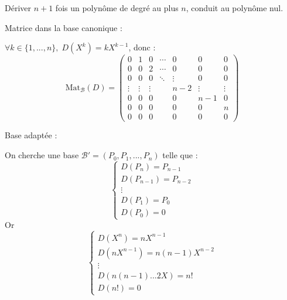 \documentclass[10pt,a4paper]{article}
\begin{document}
Dériver \(n+1\) fois un polynôme de degré au plus \(n\), conduit au polynôme nul.

\q Matrice dans la base canonique :

\(\forall k \in \{ 1, ..., n \}, \; D(X^k) = k X^{k-1}\), donc :\\
\[
\mathrm{Mat}_{\mathcal{B}}(D) = \begin{pmatrix}
0 & 1 & 0 & \cdots & 0 & 0 & 0 \\
0 & 0 & 2 & \cdots & 0 & 0 & 0 \\
0 & 0 & 0 & \ddots & \vdots & 0 & 0 \\
\vdots & \vdots & \vdots &  & n-2 & \vdots & \vdots \\
0 & 0 & 0 &  & 0 & n-1 & 0 \\
0 & 0 & 0 &  & 0 & 0 & n \\
0 & 0 & 0 &  & 0 & 0 & 0
\end{pmatrix}
\]

\q Base adaptée :

On cherche une base \(\mathcal{B}' = (P_0, P_1, ..., P_n)\) telle que :\\
\[
\begin{cases}
    D(P_n) = P_{n-1}\\
    D(P_{n-1}) = P_{n-2}\\
    \vdots \\
    D(P_1) = P_0\\
    D(P_0) = 0
 \end{cases}
\]
Or
\[
\begin{cases}
    D(X^n) = n X^{n-1}\\
    D(n X^{n-1}) = n(n-1)X^{n-2}\\
    \vdots \\
    D(n(n-1)...2 X) = n!\\
    D(n!) = 0
 \end{cases}
\]
\end{document}
